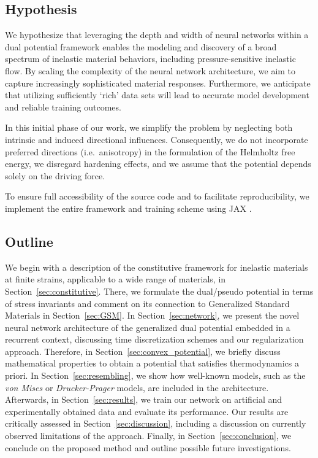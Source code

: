 \subsection{Hypothesis}
\label{sec:hypothesis}
%
We hypothesize that leveraging the depth and width of neural networks within a dual potential framework enables the modeling and discovery of a broad spectrum of inelastic material behaviors, including pressure-sensitive inelastic flow. By scaling the complexity of the neural network architecture, we aim to capture increasingly sophisticated material responses. Furthermore, we anticipate that utilizing sufficiently `rich' data sets will lead to accurate model development and reliable training outcomes.

In this initial phase of our work, we simplify the problem by neglecting both intrinsic and induced directional influences. Consequently, we do not incorporate preferred directions (i.e.\ anisotropy) in the formulation of the Helmholtz free energy, we disregard hardening effects, and we assume that the potential depends solely on the driving force.

To ensure full accessibility of the source code and to facilitate reproducibility, we implement the entire framework and training scheme using JAX \cite{jax2018github}.
%
\subsection{Outline}
\label{sec:outline}
%
We begin with a description of the constitutive framework for inelastic materials at finite strains, applicable to a wide range of materials, in Section~\ref{sec:constitutive}.
There, we formulate the dual/pseudo potential in terms of stress invariants and comment on its connection to Generalized Standard Materials in Section~\ref{sec:GSM}.
In Section~\ref{sec:network}, we present the novel neural network architecture of the generalized dual potential embedded in a recurrent context, discussing time discretization schemes and our regularization approach.
Therefore, in Section~\ref{sec:convex_potential}, we briefly discuss mathematical properties to obtain a potential that satisfies thermodynamics a priori.
In Section~\ref{sec:resembling}, we show how well-known models, such as the \textit{von Mises} or \textit{Drucker-Prager} models, are included in the architecture.
Afterwards, in Section~\ref{sec:results}, we train our network on artificial and experimentally obtained data and evaluate its performance.
Our results are critically assessed in  Section~\ref{sec:discussion}, including a discussion on currently observed limitations of the approach.
Finally, in Section~\ref{sec:conclusion}, we conclude on the proposed method and outline possible future investigations.